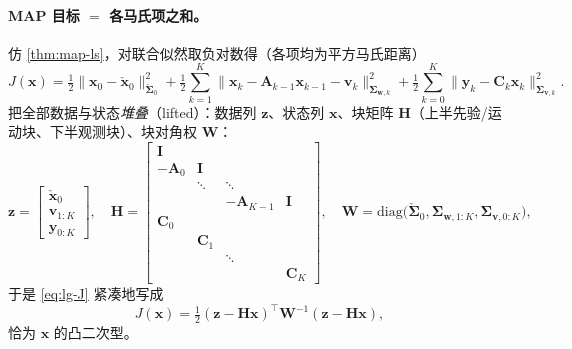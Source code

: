 \paragraph{MAP 目标 $=$ 各马氏项之和。}
仿 \cref{thm:map-ls}，对联合似然取负对数得（各项均为平方马氏距离）
\begin{equation}
  J(\mathbf{x})=\tfrac12\|\mathbf{x}_0-\check{\mathbf{x}}_0\|_{\check{\boldsymbol{\Sigma}}_0}^2
  +\tfrac12\sum_{k=1}^{K}\|\mathbf{x}_k-\mathbf{A}_{k-1}\mathbf{x}_{k-1}-\mathbf{v}_k\|_{\boldsymbol{\Sigma}_{\mathbf{w},k}}^2
  +\tfrac12\sum_{k=0}^{K}\|\mathbf{y}_k-\mathbf{C}_k\mathbf{x}_k\|_{\boldsymbol{\Sigma}_{\mathbf{v},k}}^2.
  \label{eq:lg-J}
\end{equation}
把全部数据与状态\emph{堆叠}（lifted）：数据列 $\mathbf{z}$、状态列 $\mathbf{x}$、块矩阵 $\mathbf{H}$（上半先验/运动块、下半观测块）、块对角权 $\mathbf{W}$：
\begin{equation}
  \mathbf{z}=\begin{bmatrix}\check{\mathbf{x}}_0\\\mathbf{v}_{1:K}\\\mathbf{y}_{0:K}\end{bmatrix},\quad
  \mathbf{H}=\begin{bmatrix}
    \mathbf{I}&&&\\-\mathbf{A}_0&\mathbf{I}&&\\&\ddots&\ddots&\\&&-\mathbf{A}_{K-1}&\mathbf{I}\\\hline
    \mathbf{C}_0&&&\\&\mathbf{C}_1&&\\&&\ddots&\\&&&\mathbf{C}_K\end{bmatrix},\quad
  \mathbf{W}=\mathrm{diag}\big(\check{\boldsymbol{\Sigma}}_0,\boldsymbol{\Sigma}_{\mathbf{w},1:K},\boldsymbol{\Sigma}_{\mathbf{v},0:K}\big),
  \label{eq:lg-stack}
\end{equation}
于是 \cref{eq:lg-J} 紧凑地写成
\begin{equation}
  J(\mathbf{x})=\tfrac12(\mathbf{z}-\mathbf{H}\mathbf{x})^\top\mathbf{W}^{-1}(\mathbf{z}-\mathbf{H}\mathbf{x}),
  \label{eq:batch-quadratic}
\end{equation}
恰为 $\mathbf{x}$ 的凸二次型。

